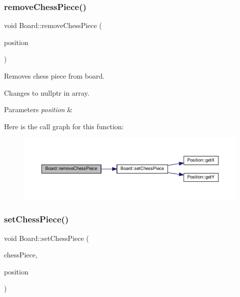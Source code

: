 \subsubsection{\texorpdfstring{remove\+Chess\+Piece()}{removeChessPiece()}}
{\footnotesize\ttfamily void Board\+::remove\+Chess\+Piece (\begin{DoxyParamCaption}\item[{\hyperlink{classPosition}{Position}}]{position }\end{DoxyParamCaption})}



Removes chess piece from board. 

Changes to nullptr in array.


\begin{DoxyParams}{Parameters}
{\em position} & \\
\hline
\end{DoxyParams}
Here is the call graph for this function\+:
\nopagebreak
\begin{figure}[H]
\begin{center}
\leavevmode
\includegraphics[width=350pt]{classBoard_a10531cbaada84808632ae9933c9f1306_cgraph}
\end{center}
\end{figure}
\mbox{\label{classBoard_aafb3a9f7f623360f66532e2f5fea0c2f}} 
\subsubsection{\texorpdfstring{set\+Chess\+Piece()}{setChessPiece()}}
{\footnotesize\ttfamily void Board\+::set\+Chess\+Piece (\begin{DoxyParamCaption}\item[{\hyperlink{classChessPiece}{Chess\+Piece} $\ast$}]{chess\+Piece,  }\item[{\hyperlink{classPosition}{Position}}]{position }\end{DoxyParamCaption})}



